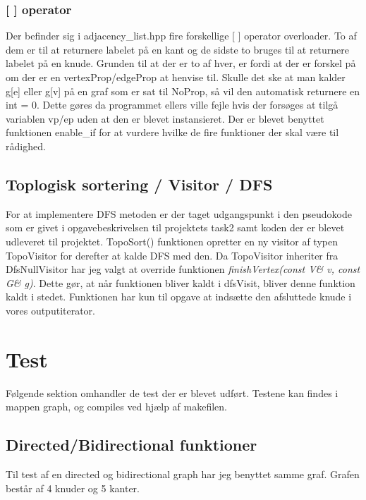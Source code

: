 \documentclass[a4paper,10pt,titlepage]{article}
\begin{document}
\subsubsection{[ ] operator}
Der befinder sig i adjacency\_list.hpp fire forskellige [ ] operator overloader. To af dem er til at returnere labelet på en kant og de sidste to bruges til at returnere labelet på en knude. Grunden til at der er to af hver, er fordi at der er forskel på om der er en vertexProp/edgeProp at henvise til. Skulle det ske at man kalder g[e] eller g[v] på en graf som er sat til NoProp, så vil den automatisk returnere en int = 0. Dette gøres da programmet ellers ville fejle hvis der forsøges at tilgå variablen vp/ep uden at den er blevet instansieret. Der er blevet benyttet funktionen enable\_if for at vurdere hvilke de fire funktioner der skal være til rådighed. 

\subsection{Toplogisk sortering / Visitor / DFS}

For at implementere DFS metoden er der taget udgangspunkt i den pseudokode som er givet i opgavebeskrivelsen til projektets task2 samt koden der er blevet udleveret til projektet. 
TopoSort() funktionen opretter en ny visitor af typen TopoVisitor for derefter at kalde DFS med den. Da TopoVisitor inheriter fra DfsNullVisitor har jeg valgt at override funktionen \textit{finishVertex(const V\& v, const G\& g)}. Dette gør, at når funktionen bliver kaldt i dfsVisit, bliver denne funktion kaldt i stedet. Funktionen har kun til opgave at indsætte den afsluttede knude i vores outputiterator.\\

\section{Test}
Følgende sektion omhandler de test der er blevet udført. Testene kan findes i mappen graph, og compiles ved hjælp af makefilen.
\subsection{Directed/Bidirectional funktioner}
Til test af en directed og bidirectional graph har jeg benyttet samme graf. Grafen består af 4 knuder og 5 kanter.
\end{document}
